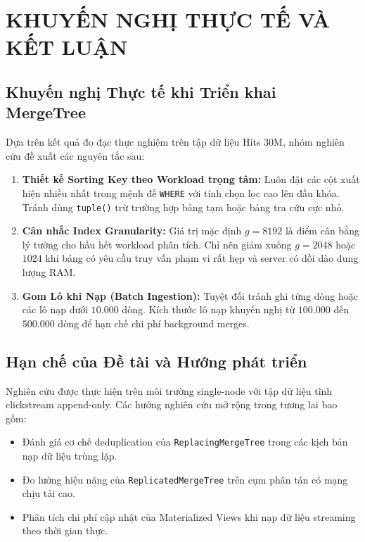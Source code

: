 \section{KHUYẾN NGHỊ THỰC TẾ VÀ KẾT LUẬN}
\label{sec:ket_luan}


\subsection{Khuyến nghị Thực tế khi Triển khai MergeTree}
Dựa trên kết quả đo đạc thực nghiệm trên tập dữ liệu Hits 30M, nhóm nghiên cứu đề xuất các nguyên tắc sau:
\begin{enumerate}
    \item \textbf{Thiết kế Sorting Key theo Workload trọng tâm:} Luôn đặt các cột xuất hiện nhiều nhất trong mệnh đề \texttt{WHERE} với tính chọn lọc cao lên đầu khóa. Tránh dùng \texttt{tuple()} trừ trường hợp bảng tạm hoặc bảng tra cứu cực nhỏ.
    \item \textbf{Cân nhắc Index Granularity:} Giá trị mặc định $g = 8192$ là điểm cân bằng lý tưởng cho hầu hết workload phân tích. Chỉ nên giảm xuống $g = 2048$ hoặc $1024$ khi bảng có yêu cầu truy vấn phạm vi rất hẹp và server có dồi dào dung lượng RAM.
    \item \textbf{Gom Lô khi Nạp (Batch Ingestion):} Tuyệt đối tránh ghi từng dòng hoặc các lô nạp dưới $10.000$ dòng. Kích thước lô nạp khuyến nghị từ $100.000$ đến $500.000$ dòng để hạn chế chi phí background merges.
\end{enumerate}

\subsection{Hạn chế của Đề tài và Hướng phát triển}
Nghiên cứu được thực hiện trên môi trường single-node với tập dữ liệu tĩnh clickstream append-only. Các hướng nghiên cứu mở rộng trong tương lai bao gồm:
\begin{itemize}
    \item Đánh giá cơ chế deduplication của \texttt{ReplacingMergeTree} trong các kịch bản nạp dữ liệu trùng lặp.
    \item Đo lường hiệu năng của \texttt{ReplicatedMergeTree} trên cụm phân tán có mạng chịu tải cao.
    \item Phân tích chi phí cập nhật của Materialized Views khi nạp dữ liệu streaming theo thời gian thực.
\end{itemize}
